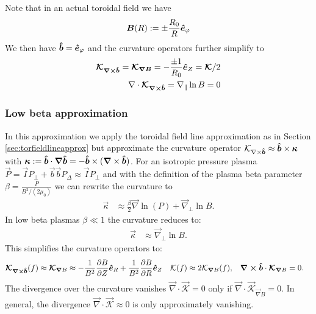 Note that in an actual toroidal field we have
\begin{align}
  {\boldsymbol{B}}(R) := \pm \frac{R_0}{R} \bm{\hat{e}}_\varphi
  \label{}
\end{align}
We then have $\bm{\hat{b}} = \bm{\hat{e}}_\varphi$ and the curvature operators further
simplify to
\begin{align}
  {\boldsymbol{ \mathcal K_{\nabla\times\bm{\hat{b}}}}} = {\boldsymbol{ \mathcal K_{\nabla B}}} = -\frac{\pm 1}{R_0} \bm{\hat{e}}_Z =
{\boldsymbol{ \mathcal K}}/2\\
  \nabla\cdot{\boldsymbol{\mathcal K_{{\nabla\times\bm{\hat{b}}}}}}=
    \nabla_\parallel \ln B = 0
    \label{}
\end{align}

\subsubsection{Low beta approximation}\label{sec:lowbetaapprox}
In this approximation we apply the toroidal field line approximation
as in Section
\ref{sec:torfieldlineapprox}
but approximate the curvature operator $\mathcal K_{\nabla\times\bm{\hat{b}}} \approx \bm{\hat{b}}\times{\boldsymbol{\kappa}}$
  with
  ${\boldsymbol{\kappa}} := \bm{\hat{b}} \cdot {\boldsymbol{\nabla}}\bm{\hat{b}} = -\bm{\hat{b}} \times({\boldsymbol{\nabla}}\times \bm{\hat{b}})$.
For an isotropic pressure plasma \(\vec{P} = \vec{I} P_\perp + \vec{b} \vec{b} P_\Delta \approx \vec{I} P_\perp\) and with the definition of the plasma beta parameter
\(\beta = \frac{P}{B^2/(2 \mu_0) } \)
we can rewrite the curvature to
\begin{align}
    \vec{\kappa} &\approx \frac{\beta}{2} \vec{\nabla} \ln(P) +\vec{\nabla}_\perp \ln{B} .
\end{align}
In low beta plasmas \(\beta\ll1\) the curvature reduces to:
\begin{align}
    \vec{\kappa} & \approx \vec{\nabla}_\perp \ln{B} .
\end{align}
This simplifies the curvature operators to:
\begin{align}
{\boldsymbol{\mathcal{K}_{{\nabla\times\bm{\hat{b}}}}}}(f) \approx
{\boldsymbol{ \mathcal{K} }}_{{\boldsymbol{\nabla}}  B}  &\approx  -\frac{1}{B^2}\frac{\partial B}{\partial Z}\bm{\hat{e}}_R +\frac{1}{B^2} \frac{\partial B}{\partial R}\bm{\hat{e}}_Z &
\mathcal{K} (f) &\approx 2\mathcal{K}_{{\boldsymbol{\nabla}}  B} (f) , &
    {\boldsymbol{{\nabla\times\bm{\hat{b}}}}} \cdot {\boldsymbol{\mathcal{K}}}_{{\boldsymbol{\nabla}}  B} &= 0.
\end{align}
The divergence over the curvature vanishes \( \vec{\nabla} \cdot \vec{ \mathcal{K} } = 0\) only if \( \vec{\nabla} \cdot \vec{ \mathcal{K}}_{\vec{\nabla}  B}   = 0\).
In general, the divergence \( \vec{\nabla} \cdot \vec{ \mathcal{K} } \approx 0\) is only approximately vanishing.
